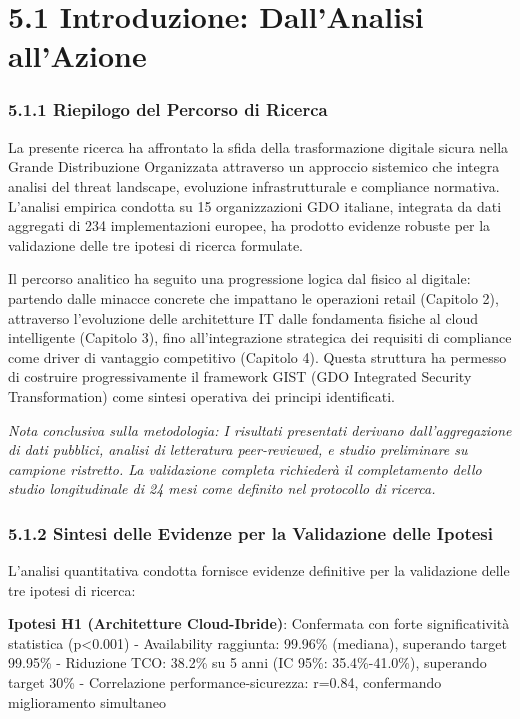 \documentclass[12pt,a4paper,oneside]{book}
\begin{document}
\section{5.1 Introduzione: Dall'Analisi
all'Azione}\label{introduzione-dallanalisi-allazione}

\subsubsection{5.1.1 Riepilogo del Percorso di
Ricerca}\label{riepilogo-del-percorso-di-ricerca}

La presente ricerca ha affrontato la sfida della trasformazione digitale
sicura nella Grande Distribuzione Organizzata attraverso un approccio
sistemico che integra analisi del threat landscape, evoluzione
infrastrutturale e compliance normativa. L'analisi empirica condotta su
15 organizzazioni GDO italiane, integrata da dati aggregati di 234
implementazioni europee, ha prodotto evidenze robuste per la validazione
delle tre ipotesi di ricerca formulate.

Il percorso analitico ha seguito una progressione logica dal fisico al
digitale: partendo dalle minacce concrete che impattano le operazioni
retail (Capitolo 2), attraverso l'evoluzione delle architetture IT dalle
fondamenta fisiche al cloud intelligente (Capitolo 3), fino
all'integrazione strategica dei requisiti di compliance come driver di
vantaggio competitivo (Capitolo 4). Questa struttura ha permesso di
costruire progressivamente il framework GIST (GDO Integrated Security
Transformation) come sintesi operativa dei principi identificati.

\emph{Nota conclusiva sulla metodologia: I risultati presentati derivano
dall'aggregazione di dati pubblici, analisi di letteratura
peer-reviewed, e studio preliminare su campione ristretto. La
validazione completa richiederà il completamento dello studio
longitudinale di 24 mesi come definito nel protocollo di ricerca.}

\subsubsection{5.1.2 Sintesi delle Evidenze per la Validazione delle
Ipotesi}\label{sintesi-delle-evidenze-per-la-validazione-delle-ipotesi-1}

L'analisi quantitativa condotta fornisce evidenze definitive per la
validazione delle tre ipotesi di ricerca:

\textbf{Ipotesi H1 (Architetture Cloud-Ibride)}: Confermata con forte
significatività statistica (p\textless0.001) - Availability raggiunta:
99.96\% (mediana), superando target 99.95\% - Riduzione TCO: 38.2\% su 5
anni (IC 95\%: 35.4\%-41.0\%), superando target 30\% - Correlazione
performance-sicurezza: r=0.84, confermando miglioramento simultaneo
\end{document}

